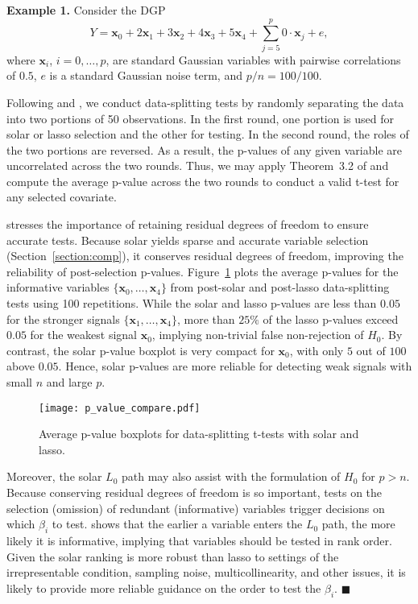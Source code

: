 \documentclass[11pt,review,authoryear]{elsarticle}
\begin{document}
\smallskip
\noindent
\textbf{Example 1.} Consider the DGP
%
\begin{equation}
  Y = \mathbf{x}_0 + 2 \mathbf{x}_1 + 3 \mathbf{x}_2 + 4 \mathbf{x}_3 + 5 \mathbf{x}_4 + \sum_{j=5}^{p} 0 \cdot \mathbf{x}_j + e,
\end{equation}
%
where $\mathbf{x}_i$, $i=0,\dots,p$, are standard Gaussian variables with pairwise correlations of $0.5$, $e$ is a standard Gaussian noise term, and $p/n=100/100$.

Following \citet[Example~4.1]{romano2019multiple} and \citet{diciccio2020exact}, we conduct data-splitting tests by randomly separating the data into two portions of 50 observations. In the first round, one portion is used for solar or lasso selection and the other for testing. In the second round, the roles of the two portions are reversed. As a result, the p-values of any given variable are uncorrelated across the two rounds. Thus, we may apply Theorem~3.2 of \citet{romano2019multiple} and compute the average p-value across the two rounds to conduct a valid t-test for any selected covariate.

\citet{diciccio2020exact} stresses the importance of retaining residual degrees of freedom to ensure accurate tests. Because solar yields sparse and accurate variable selection (Section~\ref{section:comp}), it conserves residual degrees of freedom, improving the reliability of post-selection p-values. Figure~\ref{fig:p_value_compare} plots the average p-values for the informative variables $\{\mathbf{x}_0,\ldots,\mathbf{x}_4\}$ from post-solar and post-lasso data-splitting tests using 100 repetitions. While the solar and lasso p-values are less than $0.05$ for the stronger signals $\{\mathbf{x}_1,\ldots,\mathbf{x}_4\}$, more than $25\%$ of the lasso p-values exceed $0.05$ for the weakest signal $\mathbf{x}_0$, implying non-trivial false non-rejection of $H_0$. By contrast, the solar p-value boxplot is very compact for $\mathbf{x}_0$, with only $5$ out of $100$ above $0.05$. Hence, solar p-values are more reliable for detecting weak signals with small $n$ and large $p$.

\begin{figure}[ht]
%
  \centering
%
  \texttt{[image: p\_value\_compare.pdf]}
%
  \caption{Average p-value boxplots for data-splitting t-tests with solar and lasso.}
%
  \label{fig:p_value_compare}
%
\end{figure}

Moreover, the solar $L_0$ path may also assist with the formulation of $H_0$ for $p>n$. Because conserving residual degrees of freedom is so important, tests on the selection (omission) of redundant (informative) variables trigger decisions on which $\beta_i$ to test. \citet[Theorem~2]{zhang09} shows that the earlier a variable enters the $L_0$ path, the more likely it is informative, implying that variables should be tested in rank order. Given the solar ranking is more robust than lasso to settings of the irrepresentable condition, sampling noise, multicollinearity, and other issues, it is likely to provide more reliable guidance on the order to test the $\beta_i$. $\blacksquare$
\end{document}
